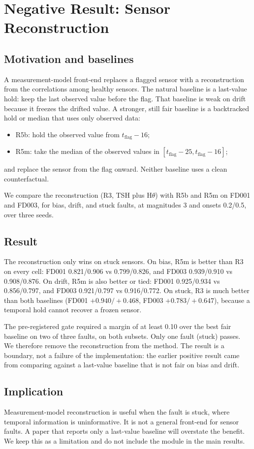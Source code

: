 \section{Negative Result: Sensor Reconstruction}
\label{sec:rhse}

\subsection{Motivation and baselines}

A measurement-model front-end replaces a flagged sensor with a reconstruction
from the correlations among healthy sensors. The natural baseline is a
last-value hold: keep the last observed value before the flag. That baseline is
weak on drift because it freezes the drifted value. A stronger, still fair
baseline is a backtracked hold or median that uses only observed data:
\begin{itemize}
\item R5b: hold the observed value from $t_{\mathrm{flag}}-16$;
\item R5m: take the median of the observed values in
$[t_{\mathrm{flag}}-25,t_{\mathrm{flag}}-16]$;
\end{itemize}
and replace the sensor from the flag onward. Neither baseline uses a clean
counterfactual.

We compare the reconstruction (R3, TSH plus H$\theta$) with R5b and R5m on
FD001 and FD003, for bias, drift, and stuck faults, at magnitudes 3 and onsets
0.2/0.5, over three seeds.



\subsection{Result}

The reconstruction only wins on stuck sensors. On bias, R5m is better than R3
on every cell: FD001 0.821/0.906 vs 0.799/0.826, and FD003 0.939/0.910 vs
0.908/0.876. On drift, R5m is also better or tied: FD001 0.925/0.934 vs
0.856/0.797, and FD003 0.921/0.797 vs 0.916/0.772. On stuck, R3 is much better
than both baselines (FD001 $+0.940/+0.468$, FD003 $+0.783/+0.647$), because a
temporal hold cannot recover a frozen sensor.

The pre-registered gate required a margin of at least 0.10 over the best fair
baseline on two of three faults, on both subsets. Only one fault (stuck) passes.
We therefore remove the reconstruction from the method. The result is a
boundary, not a failure of the implementation: the earlier positive result came
from comparing against a last-value baseline that is not fair on bias and drift.

\subsection{Implication}

Measurement-model reconstruction is useful when the fault is stuck, where
temporal information is uninformative. It is not a general front-end for sensor
faults. A paper that reports only a last-value baseline will overstate the
benefit. We keep this as a limitation and do not include the module in the main
results.
